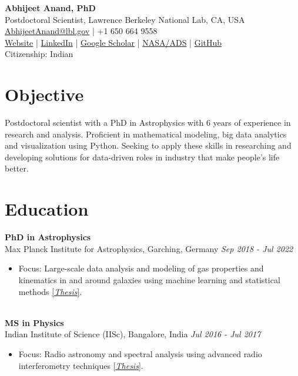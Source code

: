 \documentclass[a4paper,10pt]{article}
\begin{document}
\begin{center}
    {\LARGE \textbf{Abhijeet Anand, PhD}} \\
    Postdoctoral Scientist, Lawrence Berkeley National Lab, CA, USA \\
    \href{mailto:AbhijeetAnand@lbl.gov}{AbhijeetAnand@lbl.gov} | +1 650 664 9558 \\
     \href{https://abhi0395.github.io/}{Website}  | \href{https://www.linkedin.com/in/abhijeet-anand-iisc}{LinkedIn} | \href{https://scholar.google.com/citations?hl=en&user=MfOuq1IAAAAJ}{Google Scholar} | \href{https://ui.adsabs.harvard.edu/public-libraries/YPXGQEsNQg-zR9R9YBYFXw}{NASA/ADS} | \href{https://github.com/abhi0395}{GitHub}\\
    Citizenship: Indian\\
\end{center}

\vspace{0.5cm}

\section*{Objective}
Postdoctoral scientist with a PhD in Astrophysics with 6 years of experience in research and analysis.
Proficient in mathematical modeling, big data analytics and visualization using Python. Seeking to
apply these skills in researching and developing solutions for data-driven roles in industry that make people’s life better.

\section*{Education}
\noindent
\textbf{PhD in Astrophysics} \\
Max Planck Institute for Astrophysics, Garching, Germany \hfill \textit{Sep 2018 - Jul 2022} \\
\begin{itemize}[noitemsep, topsep=0pt]
    \item Focus: Large-scale data analysis and modeling of gas properties and kinematics in and around galaxies using machine learning and statistical methods \href{https://edoc.ub.uni-muenchen.de/30337/}{[\textit{Thesis}]}.
\end{itemize}

\noindent\\
\textbf{MS in Physics} \\
Indian Institute of Science (IISc), Bangalore, India \hfill \textit{Jul 2016 - Jul 2017} \\
\begin{itemize}[noitemsep, topsep=0pt]
    \item Focus: Radio astronomy and spectral analysis using advanced radio interferometry techniques \href{https://raw.githubusercontent.com/abhi0395/mycv/main/files/MS_thesis.pdf}{[\textit{Thesis}]}.
\end{itemize}
\end{document}

